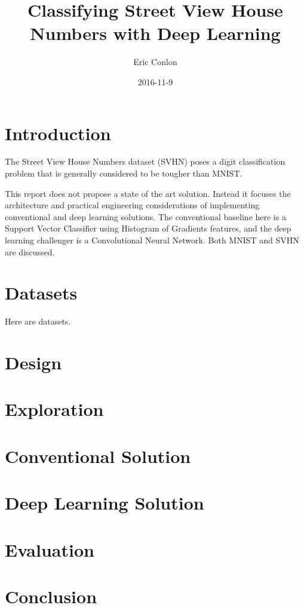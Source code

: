 \documentclass{article}
\begin{document}
\author{Eric Conlon}
\title{Classifying Street View House Numbers with Deep Learning}
\date{2016-11-9}

\maketitle{} %

\tableofcontents{} %

\section{Introduction}

The Street View House Numbers dataset (SVHN) poses a digit classification problem that is generally considered to be tougher than MNIST.

This report does not propose a state of the art solution. Instead it focuses the architecture and practical engineering considerations
of implementing conventional and deep learning solutions. The conventional baseline here is a Support Vector Classifier using Histogram of Gradients features, and the deep learning challenger is a Convolutional Neural Network. Both MNIST and SVHN are discussed.

\section{Datasets}

Here are datasets.

\section{Design}

\section{Exploration}

\section{Conventional Solution}

\section{Deep Learning Solution}

\section{Evaluation}

\section{Conclusion}

\printbibliography[heading=bibintoc,title={References}]
\end{document}
